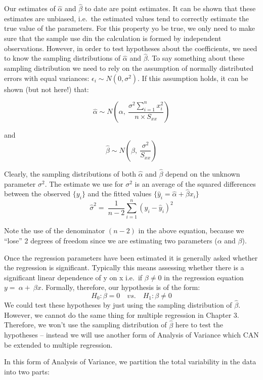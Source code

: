 \documentclass[12pt,a4paper,openany,twoside]{report}
\theoremstyle{definition}
\theoremstyle{remark}
\theoremstyle{plain}
\theoremstyle{definition}
\theoremstyle{definition}
\theoremstyle{definition}
\theoremstyle{remark}
\begin{document}
Our estimates of \(\hat{\alpha}\) and \(\hat{\beta}\) to date are point estimates.
It can be shown that these estimates are unbiased, i.e.~the estimated values tend to correctly estimate the true value of the parameters.
For this property yo be true, we only need to make sure that the sample use din the calculation is formed by independent observations.
However, in order to test hypotheses about the coefficients,
we need to know the sampling distributions of \(\hat{\alpha}\) and
\(\hat{\beta}.\) To say something about these sampling distribution
we need to rely on the assumption of normally distributed errors with
equal variances: \(\epsilon_i \sim N(0, \sigma^2)\).
If this assumption holds, it can be shown (but not here!) that:

\[\hat{\alpha}\sim N\left(\alpha,\ \frac{\sigma^{2}\sum_{i = 1}^{n}x_{i}^{2}}{n\times S_{xx}} \right)\]

and
\[\hat{\beta}\sim N\left(\beta,\ \frac{\sigma^{2}}{S_{xx}}\right)\]

Clearly, the sampling distributions of both \(\hat{\alpha}\) and
\(\hat{\beta}\) depend on the unknown parameter \(\sigma^{2}\). The
estimate we use for \(\sigma^{2}\) is an average of the squared
differences between the observed \(\{ y_{i}\}\) and the
fitted values \(\{\hat{y}_{i} = \hat{\alpha} + \hat{\beta}x_{i} \}\)
\[{\hat{\sigma}}^{2} = \ \frac{1}{n - 2}\sum_{i=1}^{n}(y_{i} - \hat{y}_{i})^{2}\]

Note the use of the denominator \((n-2)\) in the above equation, because we ``lose'' 2 degrees of freedom since we are estimating two parameters (\(\alpha\) and \(\beta\)).

Once the regression parameters have been estimated it is generally asked whether the regression is significant. Typically this means assessing whether there is a significant linear
dependence of y on x i.e.~if \(\beta \neq 0\) in the regression equation \(y = \ \alpha + \ \beta x.\) Formally, therefore, our hypothesis is of the form:
\[H_{0}:\beta = 0 \quad vs. \quad H_{1}:\beta \neq 0\]
We could test these hypotheses by just using the sampling distribution
of \(\hat{\beta}\). However, we cannot do the same thing for multiple
regression in Chapter 3. Therefore, we won't use the sampling
distribution of \(\hat{\beta}\) here to test the hypotheses -- instead
we will use another form of Analysis of Variance which CAN be extended
to multiple regression.

In this form of Analysis of Variance, we partition the total variability
in the data into two parts:
\end{document}
